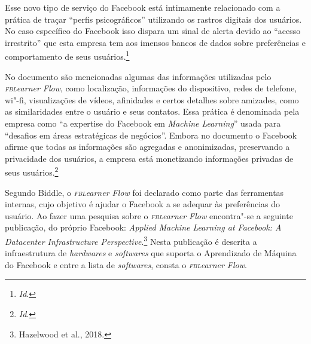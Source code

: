 Esse novo tipo de serviço do Facebook está intimamente relacionado com a
prática de traçar ``perfis psicográficos'' utilizando os rastros
digitais dos usuários. No caso específico do Facebook isso dispara um
sinal de alerta devido ao ``acesso irrestrito'' que esta empresa tem aos
imensos bancos de dados sobre preferências e comportamento de seus
usuários.\footnote{\textit{Id}.}

No documento são mencionadas algumas das informações utilizadas pelo
\textit{\textsc{fbl}earner Flow}, como localização, informações do dispositivo,
redes de telefone, wi"-fi, visualizações de vídeos, afinidades e certos
detalhes sobre amizades, como as similaridades entre o usuário e seus
contatos. Essa prática é denominada pela empresa como ``a expertise do
Facebook em \textit{Machine Learning}'' usada para ``desafios em áreas
estratégicas de negócios''. Embora no documento o Facebook afirme que
todas as informações são agregadas e anonimizadas, preservando a
privacidade dos usuários, a empresa está monetizando informações
privadas de seus usuários.\footnote{\textit{Id}.}

Segundo Biddle, o \textit{\textsc{fbl}earner Flow} foi declarado como
parte das ferramentas internas, cujo objetivo é ajudar o Facebook a se
adequar às preferências do usuário. Ao fazer uma pesquisa sobre o
\textit{\textsc{fbl}earner Flow} encontra"-se a seguinte publicação, do próprio
Facebook: \textit{Applied Machine Learning at Facebook: A Datacenter
Infrastructure Perspective}.\footnote{Hazelwood et al., 2018.} Nesta
publicação é descrita a infraestrutura de \textit{hardwares} e \textit{softwares} que
suporta o Aprendizado de Máquina do Facebook e entre a lista de
\textit{softwares}, consta o \textit{\textsc{fbl}earner Flow}.

